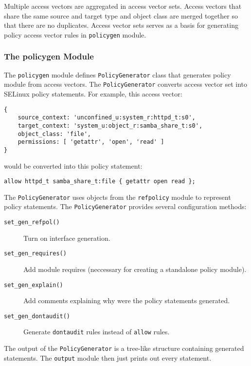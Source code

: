 Multiple access vectors are aggregated in access vector sets. Access vectors
that share the same source and target type and object class are merged together
so that there are no duplicates. Access vector sets serves as a basis for
generating policy access vector rules in \texttt{policygen} module.

\subsubsection{The policygen Module}

The \texttt{policygen} module defines \texttt{PolicyGenerator} class that
generates policy module from access vectors. The \texttt{PolicyGenerator}
converts access vector set into SELinux policy statements. For example, this
access vector:
\begin{lstlisting}
{
    source_context: 'unconfined_u:system_r:httpd_t:s0',
    target_context: 'system_u:object_r:samba_share_t:s0',
    object_class: 'file',
    permissions: [ 'getattr', 'open', 'read' ]
}
\end{lstlisting}
would be converted into this policy statement:
\begin{lstlisting}
allow httpd_t samba_share_t:file { getattr open read };
\end{lstlisting}

The \texttt{PolicyGenerator} uses objects from the \texttt{refpolicy} module to
represent policy statements. The \texttt{PolicyGenerator} provides several
configuration methods:
\begin{description}
    \item [\texttt{set\_gen\_refpol()}] Turn on interface generation.
    \item [\texttt{set\_gen\_requires()}] Add module requires (neccessary for
        creating a standalone policy module).
    \item [\texttt{set\_gen\_explain()}] Add comments explaining why were the
        policy statements generated.
    \item [\texttt{set\_gen\_dontaudit()}] Generate \texttt{dontaudit} rules
        instead of \texttt{allow} rules.
\end{description}
The output of the \texttt{PolicyGenerator} is a tree-like structure containing
generated statements. The \texttt{output} module then just prints out every
statement.

